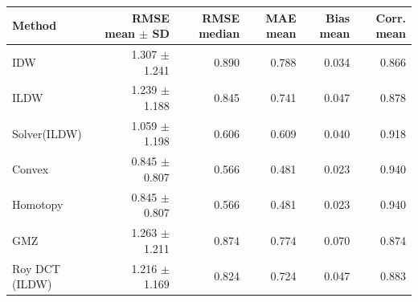 \begin{tabular}{lrrrrr}\toprule
Method & RMSE mean $\pm$ SD & RMSE median & MAE mean & Bias mean & Corr. mean \\ \midrule
IDW & 1.307 $\pm$ 1.241 & 0.890 & 0.788 & 0.034 & 0.866 \\
ILDW & 1.239 $\pm$ 1.188 & 0.845 & 0.741 & 0.047 & 0.878 \\
Solver(ILDW) & 1.059 $\pm$ 1.198 & 0.606 & 0.609 & 0.040 & 0.918 \\
Convex & 0.845 $\pm$ 0.807 & 0.566 & 0.481 & 0.023 & 0.940 \\
Homotopy & 0.845 $\pm$ 0.807 & 0.566 & 0.481 & 0.023 & 0.940 \\
GMZ & 1.263 $\pm$ 1.211 & 0.874 & 0.774 & 0.070 & 0.874 \\
Roy DCT (ILDW) & 1.216 $\pm$ 1.169 & 0.824 & 0.724 & 0.047 & 0.883 \\
\bottomrule\end{tabular}
